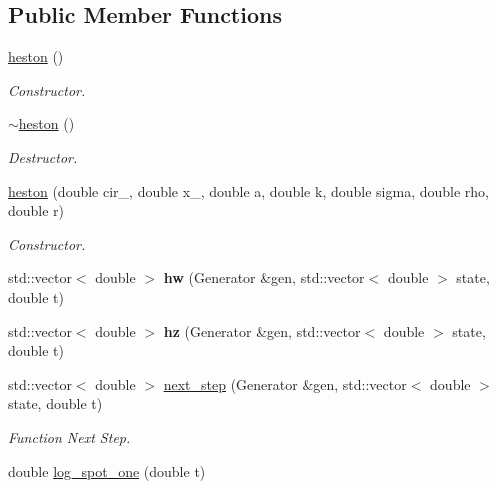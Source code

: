 \subsection*{Public Member Functions}
\begin{DoxyCompactItemize}
\item 
\hyperlink{classheston_a3938ade2d7a6d3af9130bba2066618d2}{heston} ()\hypertarget{classheston_a3938ade2d7a6d3af9130bba2066618d2}{}\label{classheston_a3938ade2d7a6d3af9130bba2066618d2}

\begin{DoxyCompactList}\small\item\em Constructor. \end{DoxyCompactList}\item 
\hyperlink{classheston_a443a0ec8ea9e1c14576f7ba6ca602dd4}{$\sim$heston} ()\hypertarget{classheston_a443a0ec8ea9e1c14576f7ba6ca602dd4}{}\label{classheston_a443a0ec8ea9e1c14576f7ba6ca602dd4}

\begin{DoxyCompactList}\small\item\em Destructor. \end{DoxyCompactList}\item 
\hyperlink{classheston_a377c1e6ea58b4078f1ae4ddef05d7251}{heston} (double cir\+\_, double x\+\_, double a, double k, double sigma, double rho, double r)\hypertarget{classheston_a377c1e6ea58b4078f1ae4ddef05d7251}{}\label{classheston_a377c1e6ea58b4078f1ae4ddef05d7251}

\begin{DoxyCompactList}\small\item\em Constructor. \end{DoxyCompactList}\item 
std\+::vector$<$ double $>$ {\bfseries hw} (Generator \&gen, std\+::vector$<$ double $>$ state, double t)\hypertarget{classheston_ae71c07c92e43ecf8320baa4085fc67b1}{}\label{classheston_ae71c07c92e43ecf8320baa4085fc67b1}

\item 
std\+::vector$<$ double $>$ {\bfseries hz} (Generator \&gen, std\+::vector$<$ double $>$ state, double t)\hypertarget{classheston_a901689fa5b94062ec3b1b1371d0107fa}{}\label{classheston_a901689fa5b94062ec3b1b1371d0107fa}

\item 
std\+::vector$<$ double $>$ \hyperlink{classheston_a81ef826578f2a62320698e88cc2b1b3b}{next\+\_\+step} (Generator \&gen, std\+::vector$<$ double $>$ state, double t)
\begin{DoxyCompactList}\small\item\em Function Next Step. \end{DoxyCompactList}\item 
double \hyperlink{classheston_a574fdb0c7e744e931bf3e8fd000ea5ca}{log\+\_\+spot\+\_\+one} (double t)
\end{DoxyCompactItemize}
